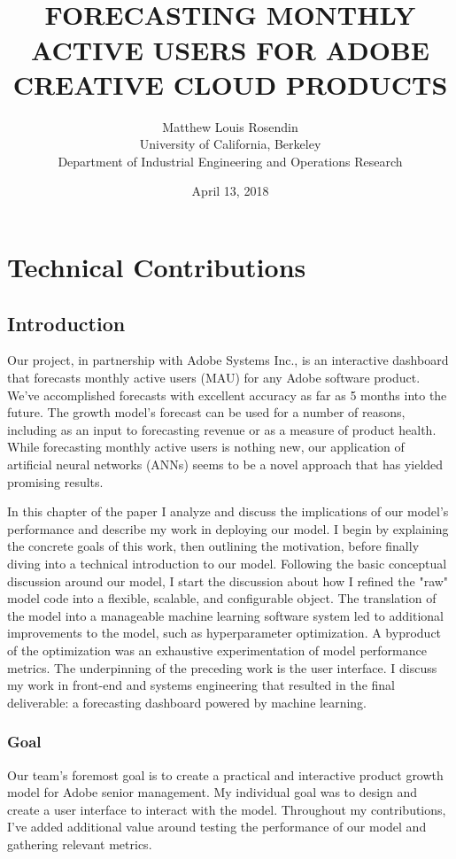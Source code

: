 \documentclass[11pt, oneside]{report}
\title{
  \HRule{0.5pt} \\
  \LARGE \textbf{\uppercase{Forecasting Monthly Active Users for Adobe Creative Cloud Products}}
  \HRule{2pt} \\ [0.5cm]
  \vspace*{5\baselineskip}
}
\author{
  Matthew Louis Rosendin \\
  University of California, Berkeley \\
  Department of Industrial Engineering and Operations Research
}
\date{April 13, 2018}
\begin{document}
\maketitle
\newpage

\tableofcontents
\newpage

\listoffigures
\newpage

\chapter{Technical Contributions}

\section{Introduction}
Our project, in partnership with Adobe Systems Inc., is an interactive dashboard that forecasts monthly active users (MAU) for any Adobe software product. We've accomplished forecasts with excellent accuracy as far as 5 months into the future. The growth model's forecast can be used for a number of reasons, including as an input to forecasting revenue or as a measure of product health. While forecasting monthly active users is nothing new, our application of artificial neural networks (ANNs) seems to be a novel approach that has yielded promising results.

In this chapter of the paper I analyze and discuss the implications of our model's performance and describe my work in deploying our model. I begin by explaining the concrete goals of this work, then outlining the motivation, before finally diving into a technical introduction to our model. Following the basic conceptual discussion around our model, I start the discussion about how I refined the "raw" model code into a flexible, scalable, and configurable object. The translation of the model into a manageable machine learning software system led to additional improvements to the model, such as hyperparameter optimization. A byproduct of the optimization was an exhaustive experimentation of model performance metrics. The underpinning of the preceding work is the user interface. I discuss my work in front-end and systems engineering that resulted in the final deliverable: a forecasting dashboard powered by machine learning.

\subsection{Goal}
Our team's foremost goal is to create a practical and interactive product growth model for Adobe senior management. My individual goal was to design and create a user interface to interact with the model. Throughout my contributions, I've added additional value around testing the performance of our model and gathering relevant metrics.
\end{document}
